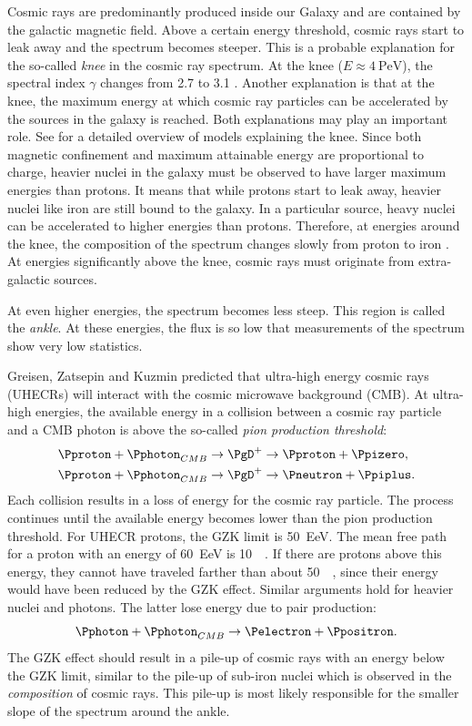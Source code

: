 Cosmic rays are predominantly produced inside our Galaxy and are contained by
the galactic magnetic field.  Above a certain energy threshold, cosmic rays
start to leak away and the spectrum becomes steeper.  This is a probable
explanation for the so-called \emph{knee} in the cosmic ray spectrum. At the
knee ($E \approx \SI{4}{\peta\electronvolt}$), the spectral index $\gamma$
changes from \num{2.7} to \num{3.1} \cite{Amenomori:2008}.
Another explanation is that at the knee, the maximum energy at which cosmic ray
particles can be accelerated by the sources in the galaxy is reached.
Both explanations may play an important role.  See \textcite{Hoerandel:2004} for
a detailed overview of models explaining the knee.  Since both magnetic
confinement and maximum attainable energy are proportional to charge, heavier
nuclei in the galaxy must be observed to have larger maximum energies than
protons.  It means that while protons start to leak away, heavier nuclei like
iron are still bound to the galaxy.  In a particular source, heavy nuclei can be
accelerated to higher energies than protons.  Therefore, at energies around the
knee, the composition of the spectrum changes slowly from proton to iron \parencite{Bird:1993}.
At energies significantly above the knee, cosmic rays must originate from
extra-galactic sources.

At even higher energies, the spectrum becomes less steep.  This region is
called the \emph{ankle}.  At these energies, the flux is so low that
measurements of the spectrum show very low statistics.

Greisen, Zatsepin and Kuzmin predicted that ultra-high energy cosmic rays
(UHECRs) will interact with the cosmic microwave background (CMB).  At
ultra-high energies, the available energy in a collision between a cosmic ray
particle and a CMB photon is above the so-called \emph{pion production
threshold}:
\begin{align}
\Pproton + \Pphoton_{CMB} &\to \PgD^+ \to \Pproton +
\Ppizero, \\
\Pproton + \Pphoton_{CMB} &\to \PgD^+ \to \Pneutron +
\Ppiplus.
\end{align}
Each collision results in a loss of energy for the cosmic ray particle. The
process continues until the available energy becomes lower than the pion
production threshold.  For UHECR protons, the GZK limit is
\SI{50}{\exa\electronvolt}. The mean free path for a proton with an energy of
\SI{60}{\exa\electronvolt} is \SI{10}{\mega\parsec}.  If there are protons above
this energy, they cannot have traveled farther than about \SI{50}{\mega\parsec},
since their energy would have been reduced by the GZK effect.  Similar arguments
hold for heavier nuclei and photons. The latter lose energy due to pair
production:
\begin{equation}
\Pphoton + \Pphoton_{CMB} \to \Pelectron + \Ppositron.
\end{equation}
The GZK effect should result in a pile-up of cosmic rays with an energy below
the GZK limit, similar to the pile-up of sub-iron nuclei which is observed in
the \emph{composition} of cosmic rays. This pile-up is most likely responsible
for the smaller slope of the spectrum around the ankle.

